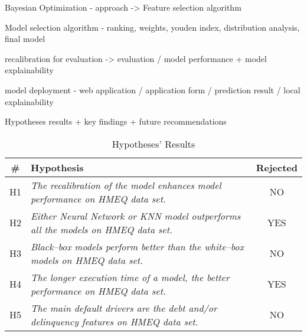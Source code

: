Bayesian Optimization - approach -> Feature selection algorithm

Model selection algorithm - ranking, weights, youden index, distribution analysis, final model

recalibration for evaluation -> evaluation / model performance + model explainability

model deployment - web application / application form / prediction result / local explainability

Hypotheses results + key findings + future recommendations


\begin{table}[H]
    \small
    \setlength{\tabcolsep}{8pt}
    \centering
    \caption[Hypotheses' Results]{Hypotheses' Results}\label{tab:hypoconclusion}
    \renewcommand{\arraystretch}{1.5}
    \begin{tabular}{c p{10cm} c}
    \toprule
    \textbf{\#} & \textbf{Hypothesis} & \textbf{Rejected} \\
    \midrule
    \hline
    H1 & \textit{The recalibration of the model enhances model performance on HMEQ data set.} & NO \\
    H2 & \textit{Either Neural Network or KNN model outperforms all the models on HMEQ data set.} & YES \\
    H3 & \textit{Black--box models perform better than the white--box models on HMEQ data set.} & NO \\
    H4 & \textit{The longer execution time of a model, the better performance on HMEQ data set.} & YES \\
    H5 & \textit{The main default drivers are the debt and/or delinquency features on HMEQ data set.} & NO \\
    \hline
    \bottomrule
    \end{tabular}
    \vspace{0.35em}
    
    \vspace{-1em}
\end{table}